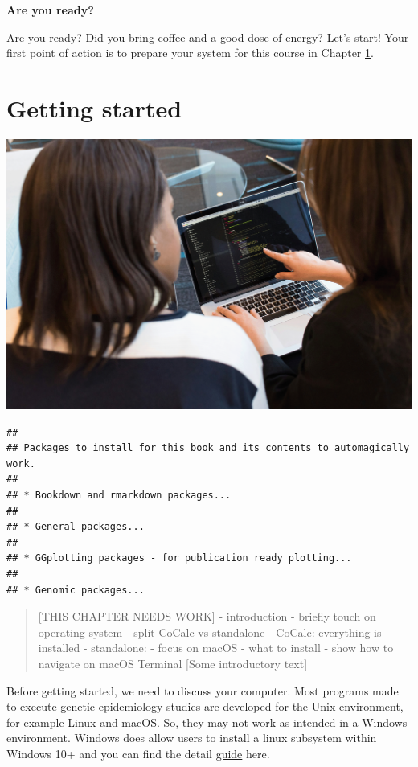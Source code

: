 \documentclass[
]{book}
\begin{document}
\textbf{Are you ready?}

Are you ready? Did you bring coffee and a good dose of energy? Let's start! Your first point of action is to prepare your system for this course in Chapter \ref{getting-started}.

\hypertarget{getting-started}{%
\chapter{Getting started}\label{getting-started}}

\includegraphics[width=1\textwidth,height=\textheight]{img/_headers/women_behind_macbook.png}

\begin{lstlisting}
## 
## Packages to install for this book and its contents to automagically work.
## 
## * Bookdown and rmarkdown packages...
## 
## * General packages...
## 
## * GGplotting packages - for publication ready plotting...
## 
## * Genomic packages...
\end{lstlisting}

\begin{quote}
{[}THIS CHAPTER NEEDS WORK{]}
- introduction
- briefly touch on operating system
- split CoCalc vs standalone
- CoCalc: everything is installed
- standalone:
- focus on macOS
- what to install
- show how to navigate on macOS Terminal
{[}Some introductory text{]}
\end{quote}

Before getting started, we need to discuss your computer. Most programs made to execute genetic epidemiology studies are developed for the Unix environment, for example Linux and macOS. So, they may not work as intended in a Windows environment. Windows does allow users to install a linux subsystem within Windows 10+ and you can find the detail \href{https://docs.microsoft.com/en-us/windows/wsl/about}{guide} here.
\end{document}
